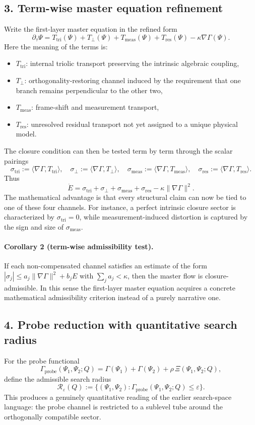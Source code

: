 \documentclass[12pt,a4paper]{article}
\begin{document}
\subsection*{3. Term-wise master equation refinement}
Write the first-layer master equation in the refined form
\[
\partial_\tau \Psi
= T_{\mathrm{tri}}(\Psi)
+ T_{\perp}(\Psi)
+ T_{\mathrm{meas}}(\Psi)
+ T_{\mathrm{res}}(\Psi)
- \kappa\nabla\Gamma(\Psi).
\]
Here the meaning of the terms is:
\begin{itemize}
 \item $T_{\mathrm{tri}}$: internal triolic transport preserving the intrinsic
 algebraic coupling,
 \item $T_{\perp}$: orthogonality-restoring channel induced by the requirement
 that one branch remains perpendicular to the other two,
 \item $T_{\mathrm{meas}}$: frame-shift and measurement transport,
 \item $T_{\mathrm{res}}$: unresolved residual transport not yet assigned to a
 unique physical model.
\end{itemize}
The closure condition can then be tested term by term through the scalar
pairings
\[
\sigma_{\mathrm{tri}}:=\langle \nabla\Gamma,T_{\mathrm{tri}}\rangle,
\quad
\sigma_{\perp}:=\langle \nabla\Gamma,T_{\perp}\rangle,
\quad
\sigma_{\mathrm{meas}}:=\langle \nabla\Gamma,T_{\mathrm{meas}}\rangle,
\quad
\sigma_{\mathrm{res}}:=\langle \nabla\Gamma,T_{\mathrm{res}}\rangle.
\]
Thus
\[
\dot E = \sigma_{\mathrm{tri}}+\sigma_{\perp}+\sigma_{\mathrm{meas}}+\sigma_{\mathrm{res}}
-\kappa\|\nabla\Gamma\|^2.
\]
The mathematical advantage is that every structural claim can now be tied to one
of these four channels. For instance, a perfect intrinsic closure sector is
characterized by $\sigma_{\mathrm{tri}}=0$, while measurement-induced distortion is
captured by the sign and size of $\sigma_{\mathrm{meas}}$.

\paragraph{Corollary 2 (term-wise admissibility test).}
If each non-compensated channel satisfies an estimate of the form
$|\sigma_j|\le a_j\|\nabla\Gamma\|^2+b_jE$ with $\sum_j a_j<\kappa$, then the
master flow is closure-admissible. In this sense the first-layer master
equation acquires a concrete mathematical admissibility criterion instead of a
purely narrative one.

\subsection*{4. Probe reduction with quantitative search radius}
For the probe functional
\[
\Gamma_{\mathrm{probe}}(\Psi_1,\Psi_2;Q)
=\Gamma(\Psi_1)+\Gamma(\Psi_2)+\rho\,\Xi(\Psi_1,\Psi_2;Q),
\]
define the admissible search radius
\[
\mathcal R_\varepsilon(Q):=
\{(\Psi_1,\Psi_2):\Gamma_{\mathrm{probe}}(\Psi_1,\Psi_2;Q)\le \varepsilon\}.
\]
This produces a genuinely quantitative reading of the earlier search-space
language: the probe channel is restricted to a sublevel tube around the
orthogonally compatible sector.
\end{document}
